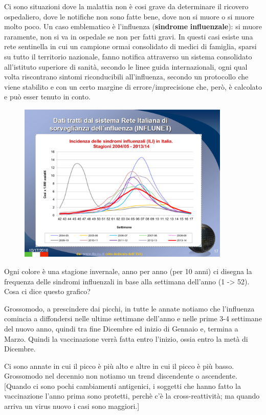 Ci sono situazioni dove la malattia non è cosi grave da determinare il
ricovero ospedaliero, dove le notifiche non sono fatte bene, dove non si
muore o si muore molto poco. Un caso emblematico è l'influenza
(\textbf{sindrome} \textbf{influenzale}): si muore raramente, non si va
in ospedale se non per fatti gravi. In questi casi esiste una rete
sentinella in cui un campione ormai consolidato di medici di famiglia,
sparsi su tutto il territorio nazionale, fanno notifica attraverso un
sistema consolidato all'istituto superiore di sanità, secondo le linee
guida internazionali, ogni qual volta riscontrano sintomi riconducibili
all'influenza, secondo un protocollo che viene stabilito e con un certo
margine di errore/imprecisione che, però, è calcolato e può esser tenuto
in conto.

\begin{figure}[!ht]
\centering
	\includegraphics[width=0.9\textwidth]{02/image3.png}
\end{figure}


Ogni colore è una stagione invernale, anno per anno (per 10 anni) ci
disegna la frequenza delle sindromi influenzali in base alla settimana
dell'anno (1 -> 52). Cosa ci dice questo grafico?

Grossomodo, a prescindere dai picchi, in tutte le annate notiamo che
l'influenza comincia a diffondersi nelle ultime settimane dell'anno e
nelle prime 3-4 settimane del nuovo anno, quindi tra fine Dicembre ed
inizio di Gennaio e, termina a Marzo. Quindi la vaccinazione verrà fatta
entro l'inizio, ossia entro la metà di Dicembre.

Ci sono annate in cui il picco è più alto e altre in cui il picco è più
basso. Grossomodo nel decennio non notiamo un trend discendente o
ascendente. {[}Quando ci sono pochi cambiamenti antigenici, i soggetti
che hanno fatto la vaccinazione l'anno prima sono protetti, perchè c'è
la cross-reattività; ma quando arriva un virus nuovo i casi sono
maggiori.{]}

